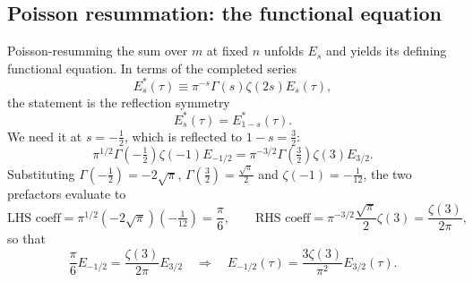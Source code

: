 \subsection*{Poisson resummation: the functional equation}
Poisson-resumming the sum over $m$ at fixed $n$ unfolds $E_s$ and yields its defining functional equation.
In terms of the completed series
\begin{equation}
E_s^{\ast}(\tau)\equiv\pi^{-s} \Gamma(s) \zeta(2s) E_s(\tau),
\end{equation}
the statement is the reflection symmetry
\begin{equation}
E_s^{\ast}(\tau)=E_{1-s}^{\ast}(\tau).
\label{eq:functional-eq}
\end{equation}
We need it at $s=-\tfrac12$, which is reflected to $1-s=\tfrac32$:
\begin{equation}
\pi^{1/2} \Gamma\left(-\tfrac12\right)\zeta(-1) E_{-1/2}
=\pi^{-3/2} \Gamma\left(\tfrac32\right)\zeta(3) E_{3/2}.
\end{equation}
Substituting $\Gamma(-\tfrac12)=-2\sqrt\pi$, $\Gamma(\tfrac32)=\tfrac{\sqrt\pi}{2}$ and $\zeta(-1)=-\tfrac{1}{12}$, the two prefactors evaluate to
\begin{equation}
\text{LHS coeff}=\pi^{1/2}(-2\sqrt\pi)\left(-\tfrac{1}{12}\right)=\frac{\pi}{6},
\qquad
\text{RHS coeff}=\pi^{-3/2}\frac{\sqrt\pi}{2} \zeta(3)=\frac{\zeta(3)}{2\pi},
\end{equation}
so that
\begin{equation}
\frac{\pi}{6} E_{-1/2}=\frac{\zeta(3)}{2\pi} E_{3/2}
\quad\Longrightarrow\quad
\boxed{ E_{-1/2}(\tau)=\frac{3\zeta(3)}{\pi^2} E_{3/2}(\tau) }.
\label{eq:Eminushalf-to-E3half}
\end{equation}

